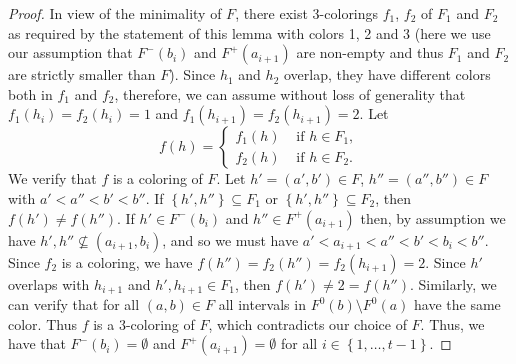 \documentclass[12pt]{article}
\theoremstyle{definition}
\begin{document}
\begin{proof}
        In view of the minimality of
        $F$, there exist 3-colorings
        $f_1$, $f_2$ of $F_1$ and $F_2$ as required
        by the statement of this lemma
        with colors 1, 2 and 3 (here
        we use our assumption that
        $F^{-}\left(b_{i}\right)$ 
        and $F^{+}\left(a_{i+1}\right)$ 
        are non-empty and thus
        $F_{1}$ and $F_{2}$ are
        strictly smaller than $F$).
        Since $h_1$ and $h_2$ overlap,
        they have different colors
        both in $f_1$ and $f_2$, therefore,
        we can assume without loss of 
        generality that
        $f_1\left(h_{i}\right) = f_2\left(h_{i}\right) = 1$
        and $f_{1}\left(h_{i+1}\right) = 
        f_2\left(h_{i+1}\right) = 2$.
        Let
        \begin{equation*}
            f\left(h\right) = 
            \begin{cases}
                f_1\left(h\right) &\text{ if } h \in F_1, \\
                f_2\left(h\right) &\text{ if } h \in F_{2}.
            \end{cases}
        \end{equation*}
        We verify that $f$ 
        is a coloring of $F$. Let
        $h' = \left(a', b'\right) \in F$,
        $h'' = \left(a'', b''\right) \in F$
        with $a' < a'' < b' < b''$.
        If $\left\{h', h''\right\} \subseteq F_1$ 
        or $\left\{h', h''\right\} \subseteq F_2$,
        then $f\left(h'\right) \neq 
        f\left(h''\right)$.
        If $h' \in F^{-}\left(b_{i}\right)$ 
        and $h'' \in F^{+}\left(a_{i+1}\right)$
        then, by assumption
        we have
        $h', h'' \not \subseteq \left(a_{i+1}, b_{i}\right)$,
        and so we must have $a' < a_{i+1} < 
        a'' < b' < b_{i} < b''$. 
        Since $f_2$ is a coloring,
        we have $f\left(h''\right) =
        f_2\left(h''\right) =
        f_2\left(h_{i+1}\right) = 2$.
        Since $h'$ overlaps with $h_{i+1}$
        and $h', h_{i+1}
        \in F_1$, then $f\left(h'\right)
        \neq 2 = f\left(h''\right)$.
        Similarly, we can verify
        that for all $\left(a, b\right) \in F$
        all intervals in $F^{0}\left(b\right)
        \setminus F^{0}\left(a\right)$
        have the same color. 
        Thus
        $f$ is a 3-coloring of $F$,
        which contradicts our choice of $F$.
        Thus, we have that
        $F^{-}\left(b_{i}\right) = \emptyset$ and
        $F^{+}\left(a_{i+1}\right) = \emptyset$ 
        for all $i \in \left\{1, \ldots, t-1\right\}$.


\end{proof}
\end{document}
